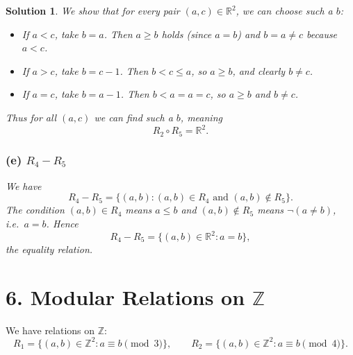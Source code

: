 \documentclass[11pt]{article}
\newtheorem*{solution}{Solution}
\begin{document}
\begin{solution}
We show that for every pair $(a,c)\in\mathbb{R}^2$, we can choose such a $b$:
\begin{itemize}
  \item If $a<c$, take $b=a$. Then $a\ge b$ holds (since $a=b$) and $b=a\neq c$ because $a<c$.
  \item If $a>c$, take $b=c-1$. Then $b<c\le a$, so $a\ge b$, and clearly $b\neq c$.
  \item If $a=c$, take $b=a-1$. Then $b<a=a=c$, so $a\ge b$ and $b\neq c$.
\end{itemize}
Thus for all $(a,c)$ we can find such a $b$, meaning
\[
R_2\circ R_5 = \mathbb{R}^2.
\]

\subsubsection*{(e) $R_4 - R_5$}
We have
\[
R_4 - R_5 = \{(a,b): (a,b)\in R_4 \text{ and } (a,b)\notin R_5\}.
\]
The condition $(a,b)\in R_4$ means $a\le b$ and $(a,b)\notin R_5$ means $\neg(a\neq b)$, i.e.\ $a=b$. Hence
\[
R_4 - R_5 = \{(a,b)\in\mathbb{R}^2 : a=b\},
\]
the equality relation.
\end{solution}

\section*{6. Modular Relations on $\mathbb{Z}$}

We have relations on $\mathbb{Z}$:
\[
R_1 = \{(a,b)\in\mathbb{Z}^2 : a\equiv b \pmod{3}\},\qquad
R_2 = \{(a,b)\in\mathbb{Z}^2 : a\equiv b \pmod{4}\}.
\]
\end{document}
